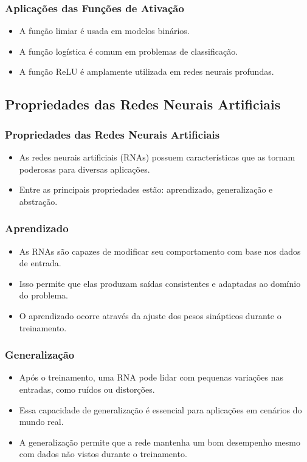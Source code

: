 \documentclass[aspectratio=169]{beamer}
\begin{document}
\begin{frame}
\frametitle{Aplicações das Funções de Ativação}
\begin{itemize}
    \item A função limiar é usada em modelos binários.
    \item A função logística é comum em problemas de classificação.
    \item A função ReLU é amplamente utilizada em redes neurais profundas.
\end{itemize}
\end{frame}

\subsection{Propriedades das Redes Neurais Artificiais}
\begin{frame}
\frametitle{Propriedades das Redes Neurais Artificiais}
\begin{itemize}
    \item As redes neurais artificiais (RNAs) possuem características que as tornam poderosas para diversas aplicações.
    \item Entre as principais propriedades estão: aprendizado, generalização e abstração.
\end{itemize}
\end{frame}

\begin{frame}
\frametitle{Aprendizado}
\begin{itemize}
    \item As RNAs são capazes de modificar seu comportamento com base nos dados de entrada.
    \item Isso permite que elas produzam saídas consistentes e adaptadas ao domínio do problema.
    \item O aprendizado ocorre através da ajuste dos pesos sinápticos durante o treinamento.
\end{itemize}
\end{frame}

\begin{frame}
\frametitle{Generalização}
\begin{itemize}
    \item Após o treinamento, uma RNA pode lidar com pequenas variações nas entradas, como ruídos ou distorções.
    \item Essa capacidade de generalização é essencial para aplicações em cenários do mundo real.
    \item A generalização permite que a rede mantenha um bom desempenho mesmo com dados não vistos durante o treinamento.
\end{itemize}
\end{frame}
\end{document}
